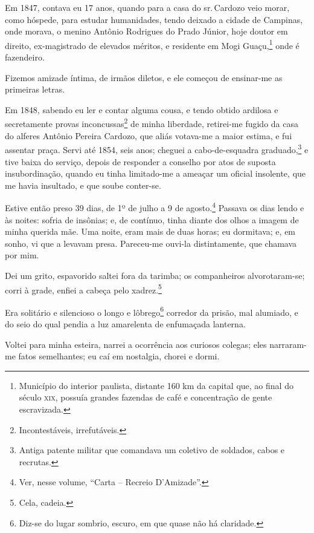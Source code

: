 Em 1847, contava eu 17 anos, quando para a casa do sr.\,Cardozo veio
morar, como hóspede, para estudar humanidades, tendo deixado a cidade de
Campinas, onde morava, o menino Antônio Rodrigues do Prado Júnior, hoje
doutor em direito, ex-magistrado de elevados méritos, e residente em
Mogi Guaçu,\footnote{Município do interior paulista, distante 160 km da
  capital que, ao final do século \textsc{xix}, possuía grandes fazendas de café
  e concentração de gente escravizada.} onde é fazendeiro.

Fizemos amizade íntima, de irmãos diletos, e ele começou de ensinar-me
as primeiras letras.

Em 1848, sabendo eu ler e contar alguma cousa, e tendo obtido ardilosa e
secretamente provas inconcussas\footnote{Incontestáveis, irrefutáveis.}
de minha liberdade, retirei-me fugido da casa do alferes Antônio Pereira
Cardozo, que aliás votava-me a maior estima, e fui assentar praça. Servi
até 1854, seis anos; cheguei a cabo-de-esquadra graduado,\footnote{
  Antiga patente militar que comandava um coletivo de soldados, cabos e
  recrutas.} e tive baixa do serviço, depois de responder a conselho
por atos de suposta insubordinação, quando eu tinha limitado-me a
ameaçar um oficial insolente, que me havia insultado, e que soube
conter-se.

Estive então preso 39 dias, de 1º de julho a 9 de agosto.\footnote{Ver,
  nesse volume, ``Carta -- Recreio D'Amizade''.} Passava os dias lendo %
e às noites: sofria de insônias; e, de contínuo, tinha diante dos olhos
a imagem de minha querida mãe. Uma noite, eram mais de duas horas; eu
dormitava; e, em sonho, vi que a levavam presa. Pareceu-me ouvi-la
distintamente, que chamava por mim.

Dei um grito, espavorido saltei fora da tarimba; os companheiros
alvorotaram-se; corri à grade, enfiei a cabeça pelo xadrez.\footnote{
  Cela, cadeia.}

Era solitário e silencioso o longo e lôbrego\footnote{Diz-se do lugar
  sombrio, escuro, em que quase não há claridade.} corredor da prisão,
mal alumiado, e do seio do qual pendia a luz amarelenta de enfumaçada
lanterna.

Voltei para minha esteira, narrei a ocorrência aos curiosos colegas;
eles narraram-me fatos semelhantes; eu caí em nostalgia, chorei e dormi.

